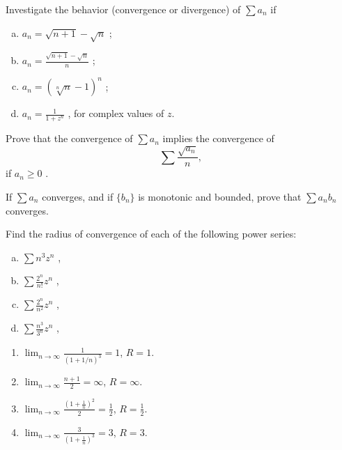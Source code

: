 \begin{myexercise}
    \label{ex:3.6}
    Investigate the behavior (convergence or divergence) of $\sum a_n$ if
    \begin{enumerate}[(a)]
        \item $a_n = \sqrt{n+1} - \sqrt{n}$ ;
        \item $a_n = \frac{\sqrt{n+1} - \sqrt{n}}{n}$ ;
        \item $a_n = (\sqrt[n]{n} - 1)^n$ ;
        \item $a_n = \frac{1}{1+z^n}$ , for complex values of $z$.
    \end{enumerate}
\end{myexercise}

\begin{myexercise}
    \label{ex:3.7}
    Prove that the convergence of $\sum a_n$ implies the convergence of
    \begin{equation*}
        \sum \frac{\sqrt{a_n}}{n},
    \end{equation*}
    if $a_n \geq 0$ .
\end{myexercise}


\begin{myexercise}
    \label{ex:3.8}
    If $\sum a_n$ converges, 
    and if $\{b_n\}$ is monotonic and bounded, 
    prove that $\sum a_n b_n$ converges.
\end{myexercise}


\begin{myexercise}
    \label{ex:3.9}
    Find the radius of convergence of each of the following power series:
    \begin{enumerate}[(a)]
        \item $\sum n^3z^n$ ,
        \item $\sum \frac{2^n}{n!}z^n$ ,
        \item $\sum \frac{2^n}{n^2}z^n$ ,
        \item $\sum \frac{n^3}{3^n}z^n$ ,
    \end{enumerate}
\end{myexercise}

\mySolve
\begin{enumerate}
    \item $\lim_{n \to \infty} \frac{1}{(1+1/n)^3} = 1$, $R = 1$.
    \item $\lim_{n \to \infty} \frac{n + 1}{2} = \infty$, $R = \infty$.
    \item $\lim_{n \to \infty} \frac{\left( 1+\frac{1}{n} \right)^2}{2} = \frac{1}{2}$, $R = \frac{1}{2}$.
    \item $\lim_{n \to \infty} \frac{3}{\left( 1+\frac{1}{n} \right)^3} = 3$, $R = 3$.
\end{enumerate}

